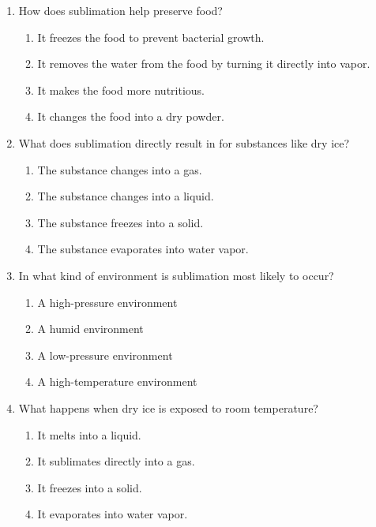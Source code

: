 \documentclass[12pt]{article}
\begin{document}
\begin{enumerate}
\vspace{0.5cm}

\item How does sublimation help preserve food?
\begin{enumerate}[label=\Alph*.]
    \item It freezes the food to prevent bacterial growth.
    \item It removes the water from the food by turning it directly into vapor.
    \item It makes the food more nutritious.
    \item It changes the food into a dry powder.
\end{enumerate}

\vspace{0.5cm}

\item What does sublimation directly result in for substances like dry ice?
\begin{enumerate}[label=\Alph*.]
    \item The substance changes into a gas.
    \item The substance changes into a liquid.
    \item The substance freezes into a solid.
    \item The substance evaporates into water vapor.
\end{enumerate}

\vspace{0.5cm}

\item In what kind of environment is sublimation most likely to occur?
\begin{enumerate}[label=\Alph*.]
    \item A high-pressure environment
    \item A humid environment
    \item A low-pressure environment
    \item A high-temperature environment
\end{enumerate}

\vspace{0.5cm}

\item What happens when dry ice is exposed to room temperature?
\begin{enumerate}[label=\Alph*.]
    \item It melts into a liquid.
    \item It sublimates directly into a gas.
    \item It freezes into a solid.
    \item It evaporates into water vapor.
\end{enumerate}


\end{enumerate}
\end{document}
